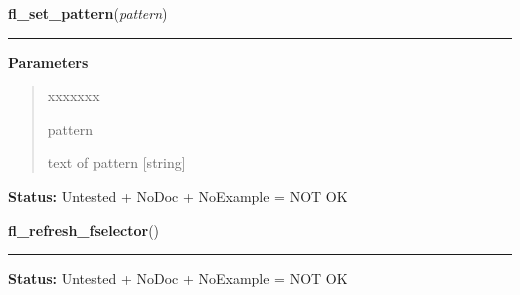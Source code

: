 \hspace{.8\funcindent}\begin{boxedminipage}{\funcwidth}

    \raggedright \textbf{fl\_set\_pattern}(\textit{pattern})

    \vspace{-1.5ex}

    \rule{\textwidth}{0.5\fboxrule}
\setlength{\parskip}{2ex}
\setlength{\parskip}{1ex}
      \textbf{Parameters}
      \vspace{-1ex}

      \begin{quote}
        \begin{Ventry}{xxxxxxx}

          \item[pattern]

          text of pattern [string]

        \end{Ventry}

      \end{quote}

\textbf{Status:} Untested + NoDoc + NoExample = NOT OK



    \end{boxedminipage}

    \label{xformslib:library:fl_refresh_fselector}

    \vspace{0.5ex}

\hspace{.8\funcindent}\begin{boxedminipage}{\funcwidth}

    \raggedright \textbf{fl\_refresh\_fselector}()

    \vspace{-1.5ex}

    \rule{\textwidth}{0.5\fboxrule}
\setlength{\parskip}{2ex}
\setlength{\parskip}{1ex}
\textbf{Status:} Untested + NoDoc + NoExample = NOT OK



    \end{boxedminipage}

    \label{xformslib:library:fl_add_fselector_appbutton}

